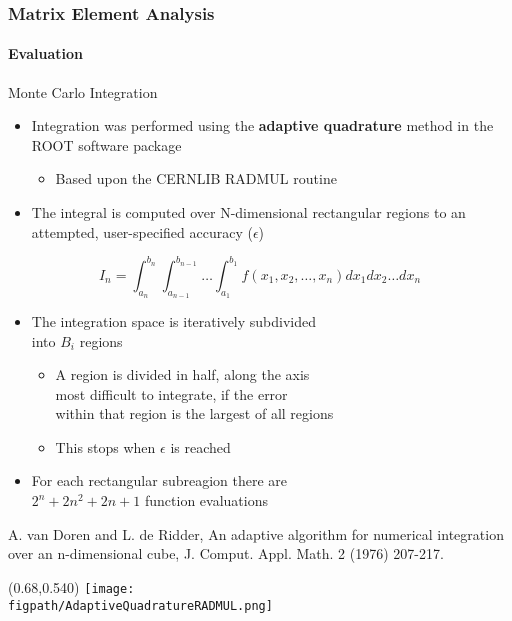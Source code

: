 \begin{frame}
	\frametitle{Matrix Element Analysis}
	\framesubtitle{Evaluation}
	\vspace*{-0.24cm}
	\begin{block}{Monte Carlo Integration}
		\begin{itemize}
			\item Integration was performed using the \textbf{adaptive quadrature} method in the ROOT software package
			\begin{itemize}
				\item Based upon the CERNLIB RADMUL routine
			\end{itemize}
			\item The integral is computed over N-dimensional rectangular regions to an attempted, user-specified accuracy ($\epsilon$)
		\end{itemize}
		\begin{equation}
			I_{n}=\int_{a_{n}}^{b_{n}}\int_{a_{n-1}}^{b_{n-1}}\ldots\int_{a_{1}}^{b_{1}}f\left(x_{1},x_{2},\ldots,x_{n}\right)dx_{1}dx_{2}{\ldots}dx_{n}
		\end{equation}
		\vspace*{-0.40cm}
		\begin{itemize}
			\item The integration space is iteratively subdivided\\into $B_{i}$ regions
			\begin{itemize}
				\item A region is divided in half, along the axis\\most difficult to integrate, if the error\\within that region is the largest of all regions
				\item This stops when $\epsilon$ is reached
			\end{itemize}
			\item For each rectangular subreagion there are\\$2^{n}+2n^{2}+2n+1$ function evaluations
		\end{itemize}
		\vspace*{-0.035cm}
		{\tiny A. van Doren and L. de Ridder, An adaptive algorithm for numerical integration over an n-dimensional cube, J. Comput. Appl. Math. 2 (1976) 207-217.}
	\end{block}
	\begin{textblock}{0.25}(0.68,0.540)
		\texttt{[image: \\figpath/AdaptiveQuadratureRADMUL.png]}
	\end{textblock}
\end{frame}

